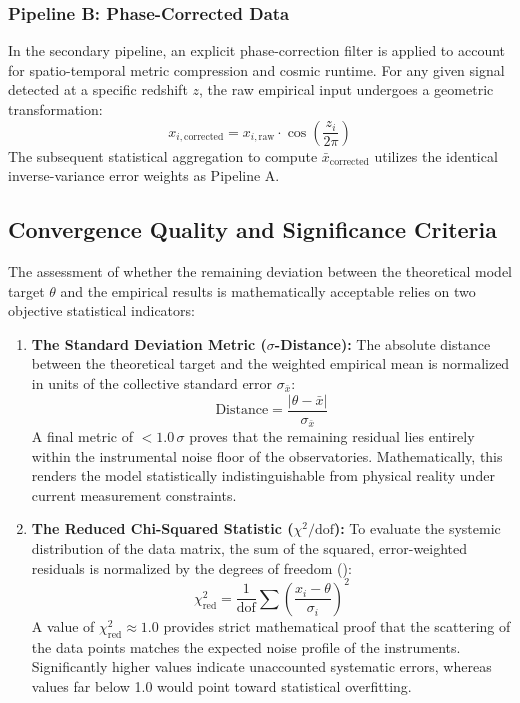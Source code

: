 \documentclass[11pt,a4paper]{article}
\theoremstyle{plain}
\theoremstyle{definition}
\theoremstyle{remark}
\begin{document}
\subsubsection{Pipeline B: Phase-Corrected Data}
In the secondary pipeline, an explicit phase-correction filter is applied to account for spatio-temporal metric compression and cosmic runtime. For any given signal detected at a specific redshift $z$, the raw empirical input undergoes a geometric transformation:
\[ x_{i,\text{corrected}} = x_{i,\text{raw}} \cdot \cos\left(\frac{z_i}{2\pi}\right) \]
The subsequent statistical aggregation to compute $\bar{x}_{\text{corrected}}$ utilizes the identical inverse-variance error weights as Pipeline A.

\subsection{Convergence Quality and Significance Criteria}
The assessment of whether the remaining deviation between the theoretical model target $\theta$ and the empirical results is mathematically acceptable relies on two objective statistical indicators:

\begin{enumerate}
    \item \textbf{The Standard Deviation Metric ($\sigma$-Distance):} 
    The absolute distance between the theoretical target and the weighted empirical mean is normalized in units of the collective standard error $\sigma_{\bar{x}}$:
    \[ \text{Distance} = \frac{|\theta - \bar{x}|}{\sigma_{\bar{x}}} \]
    A final metric of $< 1.0\,\sigma$ proves that the remaining residual lies entirely within the instrumental noise floor of the observatories. Mathematically, this renders the model statistically indistinguishable from physical reality under current measurement constraints.
    
    \item \textbf{The Reduced Chi-Squared Statistic ($\chi^2/\text{dof}$):}
    To evaluate the systemic distribution of the data matrix, the sum of the squared, error-weighted residuals is normalized by the degrees of freedom ():
    \[ \chi^2_{\text{red}} = \frac{1}{\text{dof}} \sum \left( \frac{x_i - \theta}{\sigma_i} \right)^2 \]
    A value of $\chi^2_{\text{red}} \approx 1.0$ provides strict mathematical proof that the scattering of the data points matches the expected noise profile of the instruments. Significantly higher values indicate unaccounted systematic errors, whereas values far below 1.0 would point toward statistical overfitting.
\end{enumerate}
\end{document}
